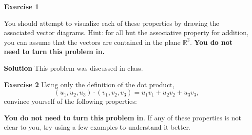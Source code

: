 \documentclass[12pt,oneside]{exam}
\newenvironment{exercise}[1]{\vspace{.1in}\noindent\textbf{Exercise #1 \hspace{.05em}}}{}
\newenvironment{newsolution}{\vspace{.1in}\noindent\textbf{Solution \hspace{.05em}}}{}
\begin{document}
\begin{exercise}{1}
You should attempt to visualize each of these properties by drawing the associated vector diagrams. Hint: for all but the associative property for addition, you can assume that the vectors are contained in the plane $\mathbb{R}^2$. \textbf{You do not need to turn this problem in.} 
\end{exercise}

\begin{newsolution} 
This problem was discussed in class.
\end{newsolution}

\begin{exercise}{2}
Using only the definition of the dot product, 
\begin{equation*}
(u_1,u_2,u_3)\cdot (v_1,v_2,v_3) = u_1v_1+u_2v_2+u_3v_3,
\end{equation*}
convince yourself of the following properties: 
\textbf{You do not need to turn this problem in}. If any of these properties is not clear to you, try using a few examples to understand it better. 
\end{exercise}
\end{document}
